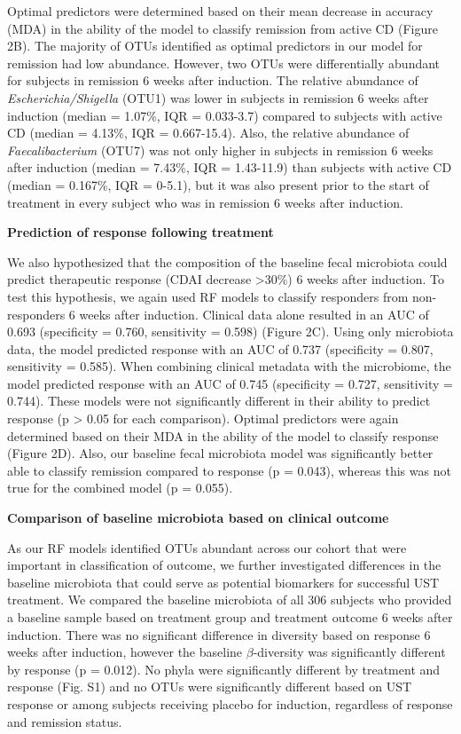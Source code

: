 \documentclass[12pt,]{article}
\begin{document}
Optimal predictors were determined based on their mean decrease in
accuracy (MDA) in the ability of the model to classify remission from
active CD (Figure 2B). The majority of OTUs identified as optimal
predictors in our model for remission had low abundance. However, two
OTUs were differentially abundant for subjects in remission 6 weeks
after induction. The relative abundance of \emph{Escherichia/Shigella}
(OTU1) was lower in subjects in remission 6 weeks after induction
(median = 1.07\%, IQR = 0.033-3.7) compared to subjects with active CD
(median = 4.13\%, IQR = 0.667-15.4). Also, the relative abundance of
\emph{Faecalibacterium} (OTU7) was not only higher in subjects in
remission 6 weeks after induction (median = 7.43\%, IQR = 1.43-11.9)
than subjects with active CD (median = 0.167\%, IQR = 0-5.1), but it was
also present prior to the start of treatment in every subject who was in
remission 6 weeks after induction.

\textbf{Prediction of response following treatment}

We also hypothesized that the composition of the baseline fecal
microbiota could predict therapeutic response (CDAI decrease
\textgreater{}30\%) 6 weeks after induction. To test this hypothesis, we
again used RF models to classify responders from non-responders 6 weeks
after induction. Clinical data alone resulted in an AUC of 0.693
(specificity = 0.760, sensitivity = 0.598) (Figure 2C). Using only
microbiota data, the model predicted response with an AUC of 0.737
(specificity = 0.807, sensitivity = 0.585). When combining clinical
metadata with the microbiome, the model predicted response with an AUC
of 0.745 (specificity = 0.727, sensitivity = 0.744). These models were
not significantly different in their ability to predict response (p
\textgreater{} 0.05 for each comparison). Optimal predictors were again
determined based on their MDA in the ability of the model to classify
response (Figure 2D). Also, our baseline fecal microbiota model was
significantly better able to classify remission compared to response (p
= 0.043), whereas this was not true for the combined model (p = 0.055).

\textbf{Comparison of baseline microbiota based on clinical outcome}

As our RF models identified OTUs abundant across our cohort that were
important in classification of outcome, we further investigated
differences in the baseline microbiota that could serve as potential
biomarkers for successful UST treatment. We compared the baseline
microbiota of all 306 subjects who provided a baseline sample based on
treatment group and treatment outcome 6 weeks after induction. There was
no significant difference in diversity based on response 6 weeks after
induction, however the baseline \({\beta}\)-diversity was significantly
different by response (p = 0.012). No phyla were significantly different
by treatment and response (Fig. S1) and no OTUs were significantly
different based on UST response or among subjects receiving placebo for
induction, regardless of response and remission status.
\end{document}

